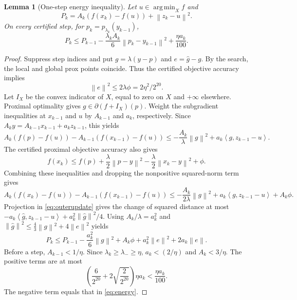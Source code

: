 \documentclass[11pt,a4paper]{article}
\newtheorem{lemma}[theorem]{Lemma}
\theoremstyle{definition}\newtheorem{definition}[theorem]{Definition}
\theoremstyle{remark}\newtheorem{remark}[theorem]{Remark}
\newcommand{\norm}[1]{\left\|#1\right\|}
\newcommand{\ip}[2]{\left\langle#1,#2\right\rangle}
\DeclareMathOperator{\argmin}{arg\,min}
\begin{document}
\begin{lemma}[One-step energy inequality]\label{lem:energy}
Let $u\in\argmin_Xf$ and
\[
 P_k=A_k(f(x_k)-f(u))+\norm{z_k-u}^2.
\]
On every certified step, for $p_k=p_{\lambda_k}(y_{k-1})$,
\begin{equation}\label{eq:energy}
 P_k\le P_{k-1}
 -\frac{\lambda_k A_k}{6}\norm{p_k-y_{k-1}}^2
 +\frac{\eta a_k}{100}.
\end{equation}
\end{lemma}
\begin{proof}
Suppress step indices and put $g=\lambda(y-p)$ and $e=\widehat g-g$. By the search, the local and global prox points coincide. Thus the certified objective accuracy implies
\[
 \norm{e}^2\le2\lambda\phi=2\eta^2/2^{20}.
\]
Let $I_X$ be the convex indicator of $X$, equal to zero on $X$
and $+\infty$ elsewhere. Proximal optimality gives
$g\in\partial(f+I_X)(p)$. Weight the subgradient inequalities at
$x_{k-1}$ and $u$ by $A_{k-1}$ and $a_k$, respectively. Since
$A_ky=A_{k-1}x_{k-1}+a_kz_{k-1}$, this yields
\[
 A_k(f(p)-f(u))-A_{k-1}(f(x_{k-1})-f(u))
 \le-\frac{A_k}{\lambda}\norm{g}^2
       +a_k\ip{g}{z_{k-1}-u}.
\]
The certified proximal objective accuracy also gives
\[
 f(x_k)\le f(p)+\frac{\lambda}{2}\norm{p-y}^2
                    -\frac{\lambda}{2}\norm{x_k-y}^2+\phi.
\]
Combining these inequalities and dropping the nonpositive squared-norm
term gives
\[
 A_k(f(x_k)-f(u))-A_{k-1}(f(x_{k-1})-f(u))
 \le-\frac{A_k}{2\lambda}\norm{g}^2
      +a_k\ip{g}{z_{k-1}-u}+A_k\phi.
\]
Projection in \eqref{eq:outerupdate} gives the change of squared distance at most
$-a_k\ip{\widehat g}{z_{k-1}-u}+a_k^2\norm{\widehat g}^2/4$.
Using $A_k/\lambda=a_k^2$ and
$\norm{\widehat g}^2\le\tfrac43\norm{g}^2+4\norm{e}^2$ yields
\[
 P_k\le P_{k-1}-\frac{a_k^2}{6}\norm{g}^2
           +A_k\phi+a_k^2\norm{e}^2+2a_k\norm{e}.
\]
Before a step, $A_{k-1}<1/\eta$. Since $\lambda_k\ge\lambda_-\ge\eta$,
$a_k<(2/\eta)$ and $A_k<3/\eta$. The positive terms are at most
\[
 \left(\frac{6}{2^{20}}+2\sqrt{\frac{2}{2^{20}}}\right)\eta a_k
 <\frac{\eta a_k}{100}.
\]
The negative term equals that in \eqref{eq:energy}.
\end{proof}
\end{document}
